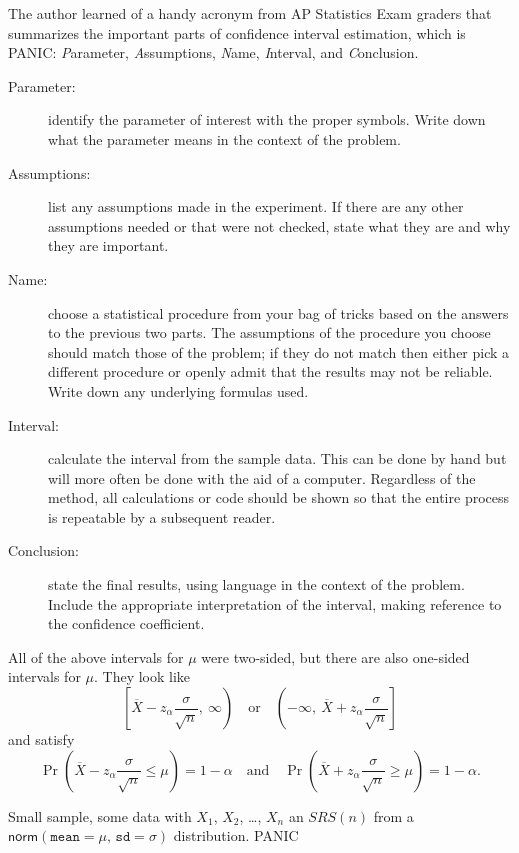 \documentclass[captions=tableheading]{scrbook}
\begin{document}
The author learned of a handy acronym from AP Statistics Exam graders that summarizes the important parts of confidence interval estimation, which is PANIC: \emph{P}arameter, \emph{A}ssumptions, \emph{N}ame, \emph{I}nterval, and \emph{C}onclusion.
\begin{description}
\item[Parameter:] identify the parameter of interest with the proper symbols. Write down what the parameter means in the context of the problem.
\item[Assumptions:] list any assumptions made in the experiment. If there are any other assumptions needed or that were not checked, state what they are and why they are important.
\item[Name:] choose a statistical procedure from your bag of tricks based on the answers to the previous two parts. The assumptions of the procedure you choose should match those of the problem; if they do not match then either pick a different procedure or openly admit that the results may not be reliable. Write down any underlying formulas used.
\item[Interval:] calculate the interval from the sample data. This can be done by hand but will more often be done with the aid of a computer. Regardless of the method, all calculations or code should be shown so that the entire process is repeatable by a subsequent reader.
\item[Conclusion:] state the final results, using language in the context of the problem. Include the appropriate interpretation of the interval, making reference to the confidence coefficient.
\end{description}

\begin{rem}
All of the above intervals for \(\mu\) were two-sided, but there are also one-sided intervals for \(\mu\). They look like
\begin{equation}
\left[\overline{X}-z_{\alpha}\frac{\sigma}{\sqrt{n}},\ \infty\right)\quad\mbox{or}\quad\left(-\infty,\ \overline{X}+z_{\alpha}\frac{\sigma}{\sqrt{n}}\right]
\end{equation}
and satisfy
\begin{equation}
\Pr\left(\overline{X}-z_{\alpha}\frac{\sigma}{\sqrt{n}}\leq\mu\right)=1-\alpha\quad\mbox{and}\quad\Pr\left(\overline{X}+z_{\alpha}\frac{\sigma}{\sqrt{n}}\geq\mu\right)=1-\alpha.
\end{equation}
\end{rem}


\begin{example}
Small sample, some data with \(X_{1}\), \(X_{2}\), \ldots{}, \(X_{n}\) an \(SRS(n)\) from a \(\mathsf{norm}(\mathtt{mean}=\mu,\,\mathtt{sd}=\sigma)\) distribution.  PANIC
\end{example}
\end{document}
